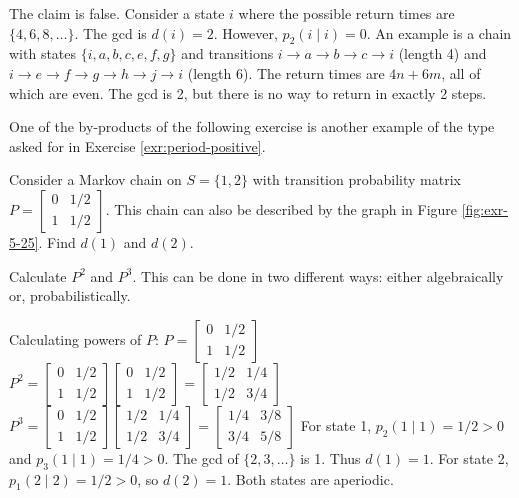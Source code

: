 \begin{Solution}
The claim is false. Consider a state $i$ where the possible return times are $\{4, 6, 8, \dots\}$. The gcd is $d(i) = 2$. However, $p_2(i \mid i) = 0$.
An example is a chain with states $\{i, a, b, c, e, f, g\}$ and transitions $i \to a \to b \to c \to i$ (length 4) and $i \to e \to f \to g \to h \to j \to i$ (length 6). The return times are $4n + 6m$, all of which are even. The gcd is 2, but there is no way to return in exactly 2 steps.
\end{Solution}

One of the by-products of the following exercise is another example of the type asked for in Exercise \ref{exr:period-positive}.

\begin{Exercise}
\label{exr:period-two-state}
Consider a Markov chain on $S = \{1,2\}$ with transition probability matrix $P = \begin{bmatrix} 0 & 1/2 \\ 1 & 1/2 \end{bmatrix}$. This chain can also be described by the graph in Figure \ref{fig:exr-5-25}. Find $d(1)$ and $d(2)$.

\begin{hint}
Calculate $P^2$ and $P^3$. This can be done in two different ways: either algebraically or, probabilistically.
\end{hint}
\end{Exercise}

\begin{Solution}
Calculating powers of $P$:
$P = \begin{bmatrix} 0 & 1/2 \\ 1 & 1/2 \end{bmatrix}$
$P^2 = \begin{bmatrix} 0 & 1/2 \\ 1 & 1/2 \end{bmatrix} \begin{bmatrix} 0 & 1/2 \\ 1 & 1/2 \end{bmatrix} = \begin{bmatrix} 1/2 & 1/4 \\ 1/2 & 3/4 \end{bmatrix}$
$P^3 = \begin{bmatrix} 0 & 1/2 \\ 1 & 1/2 \end{bmatrix} \begin{bmatrix} 1/2 & 1/4 \\ 1/2 & 3/4 \end{bmatrix} = \begin{bmatrix} 1/4 & 3/8 \\ 3/4 & 5/8 \end{bmatrix}$
For state 1, $p_2(1 \mid 1) = 1/2 > 0$ and $p_3(1 \mid 1) = 1/4 > 0$. The gcd of $\{2, 3, \dots\}$ is 1. Thus $d(1) = 1$.
For state 2, $p_1(2 \mid 2) = 1/2 > 0$, so $d(2) = 1$.
Both states are aperiodic.
\end{Solution}

